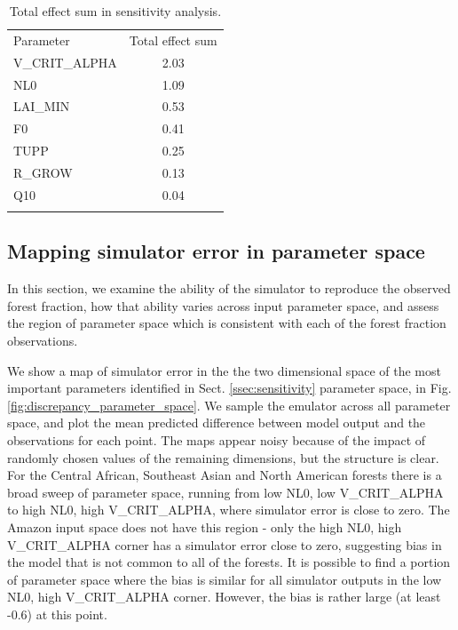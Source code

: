 \documentclass[esd, manuscript]{copernicus}
\begin{document}
\begin{table}[t]
\caption{Total effect sum in sensitivity analysis.}\label{tab:effects_sum}
\begin{tabular}{lc}

\tophline
Parameter &  Total effect sum \\
V\_CRIT\_ALPHA & 2.03 \\
NL0 & 1.09 \\
LAI\_MIN & 0.53 \\
F0 & 0.41 \\
TUPP & 0.25 \\
R\_GROW  & 0.13 \\
Q10 & 0.04 \\

\bottomhline
\end{tabular}
\belowtable{} %
\end{table}


\subsection{Mapping simulator error in parameter space}\label{ssec:mapping}

In this section, we examine the ability of the simulator to reproduce the observed forest fraction, how that ability varies across input parameter space, and assess the region of parameter space which is consistent with each of the forest fraction observations.

We show a map of simulator error in the the two dimensional space of the most important parameters identified in Sect. \ref{ssec:sensitivity} parameter space, in Fig.  \ref{fig:discrepancy_parameter_space}. We sample the emulator across all parameter space, and plot the mean predicted difference between model output and the observations for each point. The maps appear noisy because of the impact of randomly chosen values of the remaining dimensions, but the structure is clear. For the Central African, Southeast Asian and North American forests there is a broad sweep of parameter space, running from low NL0, low V\_CRIT\_ALPHA to high NL0, high V\_CRIT\_ALPHA, where simulator error is close to zero. The Amazon input space does not have this region - only the high NL0, high V\_CRIT\_ALPHA corner has a simulator error close to zero, suggesting bias in the model that is not common to all of the forests. It is possible to find a portion of parameter space where the bias is similar for all simulator outputs in the low NL0, high V\_CRIT\_ALPHA corner. However, the bias is rather large (at least -0.6) at this point.
\end{document}
